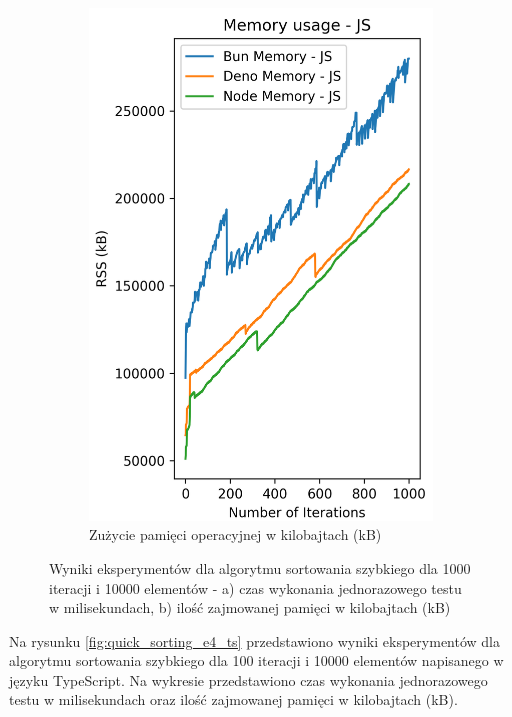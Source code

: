 \begin{figure}[H]
\begin{subfigure}[b]{0.4\textwidth}
    \includegraphics[width=\textwidth]{Figures/sorting/sorting_quick_1000_10000_js_memory.png}
    \caption{Zużycie pamięci operacyjnej w kilobajtach (kB)}
    \label{fig:quick_sorting_e4_memory}
  \end{subfigure}
  \caption{Wyniki eksperymentów dla algorytmu sortowania szybkiego dla 1000 iteracji i 10000 elementów - a) czas wykonania jednorazowego testu w milisekundach, b) ilość zajmowanej pamięci w kilobajtach (kB)}
  \label{fig:quick_sorting_e4}
\end{figure}
Na rysunku \ref{fig:quick_sorting_e4_ts} przedstawiono wyniki eksperymentów dla algorytmu sortowania szybkiego dla 100 iteracji i 10000 elementów napisanego w języku TypeScript. Na wykresie przedstawiono czas wykonania jednorazowego testu w milisekundach oraz ilość zajmowanej pamięci w kilobajtach (kB).

